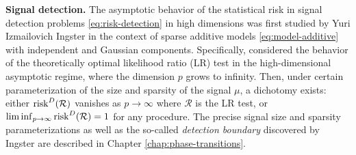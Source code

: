 

\medskip
{\bf Signal detection.}
The asymptotic behavior of the statistical risk in signal detection problems \eqref{eq:risk-detection} in high dimensions was first studied by 
Yuri Izmailovich Ingster in the context of sparse additive models \eqref{eq:model-additive} with 
independent and Gaussian components. Specifically, \cite{ingster1998minimax} considered the behavior of the 
theoretically optimal likelihood ratio (\ac{LR}) test in the high-dimensional asymptotic regime, where the dimension $p$ grows to infinity. Then, under certain parameterization of the size and sparsity of the signal $\mu$, a dichotomy exists: 
either ${\rm risk}^D(\mathcal{R})$ vanishes as $p\to\infty$ where $\mathcal{R}$ is the \ac{LR} test, or $\liminf_{p\to\infty} {\rm risk}^D(\mathcal{R}) = 1$ for any procedure.
The precise signal size and sparsity parameterizations as well as the so-called {\em detection boundary} discovered by Ingster are described in Chapter \ref{chap:phase-transitions}.

